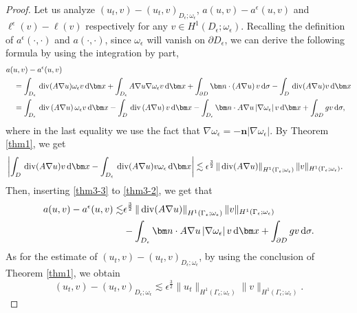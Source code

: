 \documentclass[3p,times]{elsarticle}
\numberwithin{equation}{section}
\newcommand{\dd}{\,{\rm d}}
\newcommand{\divo}{\,{\rm div}}
\begin{document}
\begin{proof}
	Let us analyze $\left(u_t,v\right)-\left(u_t,v\right)_{D_{\epsilon};\omega_{\epsilon}}$, $a(u,v)-a^{\epsilon}(u,v)$ and $\ell^{\epsilon}(v)-\ell(v)$ respectively for any $v \in H^1(D_{\epsilon};\omega_{\epsilon})$. 
	Recalling the definition of $a^{\epsilon}(\cdot,\cdot)$ and $a(\cdot,\cdot)$, since $\omega_{\epsilon}$ will vanish on  $\partial D_{\epsilon}$, we can derive the following formula by using the integration by part,
	{\small\begin{equation}\label{thm3-2}
			\begin{aligned}
				&a(u,v)-a^{\epsilon}(u,v)\\
				&\quad=\int_{D_{\epsilon}} \divo(A\nabla u)\omega_{\epsilon}v\dd\bm x+\int_{D_{\epsilon}} A\nabla u\nabla \omega_{\epsilon} v\dd \bm x+\int_{\partial D} \bm n\cdot \left(A\nabla u\right)v\dd \sigma-\int_D\divo(A\nabla u)v\dd \bm x\\
				&\quad=\int_{D_{\epsilon}}\divo\left(A\nabla u\right)\omega_{\epsilon} v\dd\bm x-\int_D\divo\left(A\nabla u\right)v\dd \bm x-\int_{D_{\epsilon}} \bm n\cdot A\nabla u\left|\nabla \omega_{\epsilon}\right|v\dd \bm x+\int_{\partial D} gv\dd \sigma,
			\end{aligned}
	\end{equation}}
	where in the last equality we use the fact that $\nabla \omega_{\epsilon}=-\bm n\left|\nabla \omega_{\epsilon}\right|$. By Theorem \ref{thm1}, we get
	\begin{align}
		\label{thm3-3}
		&\left|\int_D \divo(A\nabla u)v\dd \bm x-\int_{D_{\epsilon}} \divo(A\nabla u)v\omega_{\epsilon}\dd \bm x\right|
		\lesssim \epsilon^{\frac 3 2}\left\|\divo(A\nabla u)\right\|_{H^1(\Gamma_{\epsilon};\omega_{\epsilon})}\|v\|_{H^1(\Gamma_{\epsilon};\omega_{\epsilon})}.
	\end{align}
	Then, inserting \eqref{thm3-3} to \eqref{thm3-2}, we get that
	\begin{equation}
		\label{thm3-4}
		\begin{aligned}
			a(u,v)-a^{\epsilon}(u,v)\lesssim& \epsilon^{\frac 3 2}\left\|\divo(A\nabla u)\right\|_{H^1(\Gamma_{\epsilon};\omega_{\epsilon})}\|v\|_{H^1(\Gamma_{\epsilon};\omega_{\epsilon})}\\
			&-\int_{D_{\epsilon}} \bm n\cdot A\nabla u\left|\nabla \omega_{\epsilon}\right|v\dd \bm x+\int_{\partial D} gv\dd \sigma.
		\end{aligned}
	\end{equation}
	As for the estimate of $\left(u_t,v\right)-\left(u_t,v\right)_{D_{\epsilon};\omega_{\epsilon}}$, by using the conclusion of Theorem \ref{thm1}, we obtain
	\begin{equation}
		\label{thm3-5}
		\left(u_t,v\right)-\left(u_t,v\right)_{D_{\epsilon};\omega_{\epsilon}}\lesssim \epsilon^{\frac 3 2}\|u_t\|_{H^1(\Gamma_{\epsilon};\omega_{\epsilon})}\|v\|_{H^1(\Gamma_{\epsilon};\omega_{\epsilon})}.
	\end{equation}
	

\end{proof}
\end{document}
